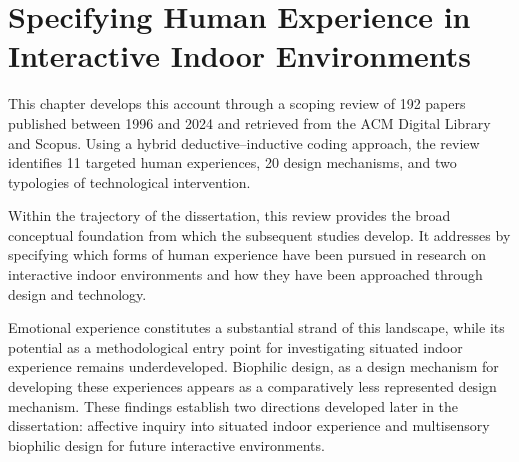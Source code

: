 \chapter{Specifying Human Experience in Interactive Indoor Environments}\label{ch:study-one}

\begin{synopsis}

This chapter develops this account through a scoping review of 192 papers published between 1996 and 2024 and retrieved from the ACM Digital Library and Scopus. Using a hybrid deductive--inductive coding approach, the review identifies 11 targeted human experiences, 20 design mechanisms, and two typologies of technological intervention.

Within the trajectory of the dissertation, this review provides the broad conceptual foundation from which the subsequent studies develop. It addresses  by specifying which forms of human experience have been pursued in research on interactive indoor environments and how they have been approached through design and
technology. 

Emotional experience constitutes a substantial strand of this landscape, while its potential as a methodological entry point for investigating situated indoor experience remains underdeveloped. Biophilic design, as a design mechanism for developing these experiences appears as a comparatively less represented design
mechanism. These findings establish two directions developed later in the dissertation: affective inquiry into situated indoor experience and multisensory biophilic design for future interactive environments.
\end{synopsis}


